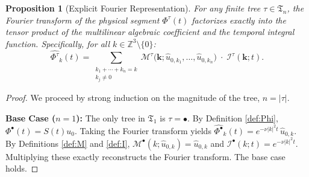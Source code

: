 \documentclass[12pt,a4paper]{article}
\theoremstyle{plain}
\newtheorem{proposition}[theorem]{Proposition}
\theoremstyle{definition}
\theoremstyle{remark}
\newcommand{\Z}{\mathbb{Z}}
\newcommand{\MM}{\mathcal{M}}
\newcommand{\II}{\mathcal{I}}
\newcommand{\fT}{\mathfrak{T}}
\begin{document}
\begin{proposition}[Explicit Fourier Representation]
\label{prop:fourier}
For any finite tree $\tau \in \fT_n$, the Fourier transform of the physical segment $\Phi^\tau(t)$ factorizes exactly into the tensor product of the multilinear algebraic coefficient and the temporal integral function. Specifically, for all $k \in \Z^3 \setminus \{0\}$:
\[
  \widehat{\Phi^\tau}_k(t)
  =
  \sum_{\substack{k_1+\cdots+k_n = k \\ k_j\neq 0}}
  \MM^\tau\big(\mathbf{k};\hat{u}_{0,k_1},\dots,\hat{u}_{0,k_n}\big)
  \;\cdot\;
  \II^\tau(\mathbf{k};t).
\]
\end{proposition}

\begin{proof}
We proceed by strong induction on the magnitude of the tree, $n = |\tau|$.

\noindent\textbf{Base Case ($n=1$):} The only tree in $\fT_1$ is $\tau = \bullet$. By Definition \ref{def:Phi}, $\Phi^\bullet(t) = S(t)u_0$. Taking the Fourier transform yields $\widehat{\Phi^\bullet}_k(t) = e^{-\nu|k|^2 t}\,\hat{u}_{0,k}$. By Definitions \ref{def:M} and \ref{def:I}, $\MM^\bullet(k;\hat{u}_{0,k}) = \hat{u}_{0,k}$ and $\II^\bullet(k;t) = e^{-\nu|k|^2 t}$. Multiplying these exactly reconstructs the Fourier transform. The base case holds.


\end{proof}
\end{document}
